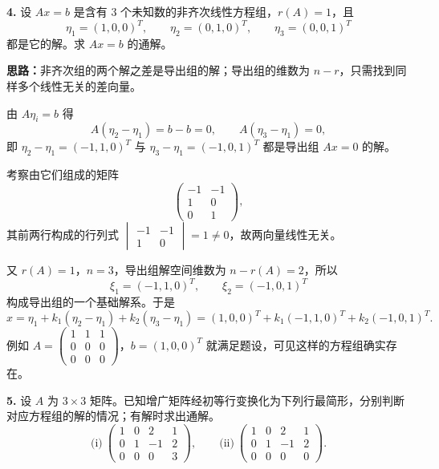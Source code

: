 \else \answerarea[8] \fi%

\textbf{4.} 设 $Ax=b$ 是含有 $3$ 个未知数的非齐次线性方程组，$r(A)=1$，且
\[
\eta_1=(1,0,0)^T,\qquad \eta_2=(0,1,0)^T,\qquad \eta_3=(0,0,1)^T
\]
都是它的解。求 $Ax=b$ 的通解。

\ifshowsolutions%

\textbf{思路：}非齐次组的两个解之差是导出组的解；导出组的维数为 $n-r$，只需找到同样多个线性无关的差向量。

由 $A\eta_i=b$ 得
\[
A(\eta_2-\eta_1)=b-b=0,\qquad A(\eta_3-\eta_1)=0,
\]
即 $\eta_2-\eta_1=(-1,1,0)^T$ 与 $\eta_3-\eta_1=(-1,0,1)^T$ 都是导出组 $Ax=0$ 的解。

考察由它们组成的矩阵
\[
\begin{pmatrix}-1&-1\\1&0\\0&1\end{pmatrix},
\]
其前两行构成的行列式 $\begin{vmatrix}-1&-1\\1&0\end{vmatrix}=1\neq0$，故两向量线性无关。

又 $r(A)=1$，$n=3$，导出组解空间维数为 $n-r(A)=2$，所以
\[
\xi_1=(-1,1,0)^T,\qquad \xi_2=(-1,0,1)^T
\]
构成导出组的一个基础解系。于是
\[
x=\eta_1+k_1(\eta_2-\eta_1)+k_2(\eta_3-\eta_1)
=(1,0,0)^T+k_1(-1,1,0)^T+k_2(-1,0,1)^T.
\]
例如 $A=\begin{pmatrix}1&1&1\\0&0&0\\0&0&0\end{pmatrix}$，$b=(1,0,0)^T$ 就满足题设，可见这样的方程组确实存在。

\else \answerarea[8] \fi%

\textbf{5.} 设 $A$ 为 $3\times 3$ 矩阵。已知增广矩阵经初等行变换化为下列行最简形，分别判断对应方程组的解的情况；有解时求出通解。
\[
\text{(i)}\ \left(\begin{array}{ccc|c}
1&0&2&1\\
0&1&-1&2\\
0&0&0&3
\end{array}\right),
\qquad
\text{(ii)}\ \left(\begin{array}{ccc|c}
1&0&2&1\\
0&1&-1&2\\
0&0&0&0
\end{array}\right).
\]

